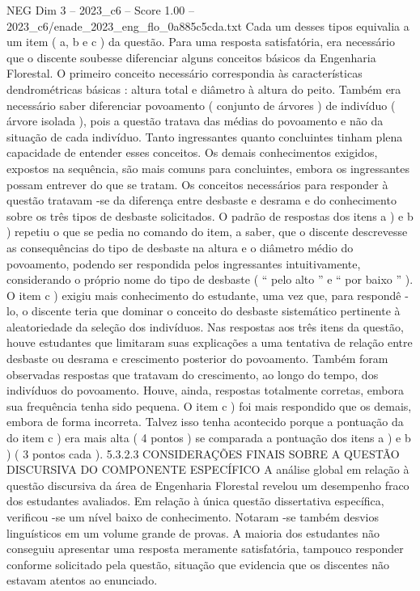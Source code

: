 \begin{textsample}{NEG Dim 3 – 2023\_c6 – Score 1.00 – 2023\_c6/enade\_2023\_eng\_flo\_0a885c5cda.txt}
Cada um desses tipos equivalia a um item ( a, b e c ) da questão.
Para uma resposta satisfatória, era necessário que o discente soubesse diferenciar alguns conceitos básicos da Engenharia Florestal.
O primeiro conceito necessário correspondia às características dendrométricas básicas : altura total e diâmetro à altura do peito.
Também era necessário saber diferenciar povoamento ( conjunto de árvores ) de indivíduo ( árvore isolada ), pois a questão tratava das médias do povoamento e não da situação de cada indivíduo.
Tanto ingressantes quanto concluintes tinham plena capacidade de entender esses conceitos.
Os demais conhecimentos exigidos, expostos na sequência, são mais comuns para concluintes, embora os ingressantes possam entrever do que se tratam.
Os conceitos necessários para responder à questão tratavam -se da diferença entre desbaste e desrama e do conhecimento sobre os três tipos de desbaste solicitados.
O padrão de respostas dos itens a ) e b ) repetiu o que se pedia no comando do item, a saber, que o discente descrevesse as consequências do tipo de desbaste na altura e o diâmetro médio do povoamento, podendo ser respondida pelos ingressantes intuitivamente, considerando o próprio nome do tipo de desbaste ( “ pelo alto ” e “ por baixo ” ).
O item c ) exigiu mais conhecimento do estudante, uma vez que, para respondê -lo, o discente teria que dominar o conceito do desbaste sistemático pertinente à aleatoriedade da seleção dos indivíduos.
Nas respostas aos três itens da questão, houve estudantes que limitaram suas explicações a uma tentativa de relação entre desbaste ou desrama e crescimento posterior do povoamento.
Também foram observadas respostas que tratavam do crescimento, ao longo do tempo, dos indivíduos do povoamento.
Houve, ainda, respostas totalmente corretas, embora sua frequência tenha sido pequena.
O item c ) foi mais respondido que os demais, embora de forma incorreta.
Talvez isso tenha acontecido porque a pontuação da do item c ) era mais alta ( 4 pontos ) se comparada a pontuação dos itens a ) e b ) ( 3 pontos cada ). 5.3.2.3 CONSIDERAÇÕES FINAIS SOBRE A QUESTÃO DISCURSIVA DO COMPONENTE ESPECÍFICO A análise global em relação à questão discursiva da área de Engenharia Florestal revelou um desempenho fraco dos estudantes avaliados.
Em relação à única questão dissertativa específica, verificou -se um nível baixo de conhecimento.
Notaram -se também desvios linguísticos em um volume grande de provas.
A maioria dos estudantes não conseguiu apresentar uma resposta meramente satisfatória, tampouco responder conforme solicitado pela questão, situação que evidencia que os discentes não estavam atentos ao enunciado.

\end{textsample}
